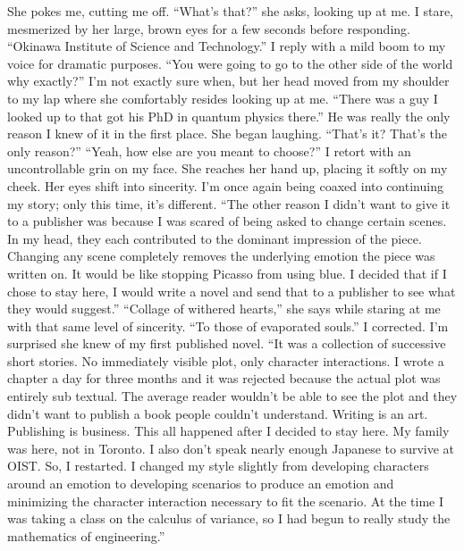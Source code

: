 \documentclass[a4paper, 12pt]{book}
\newcommand\tab[1][1cm]{\hspace*{#1}}
\begin{document}
\newline
\tab
She pokes me, cutting me off. “What’s that?” she asks, looking up at me.
\newline
\tab
I stare, mesmerized by her large, brown eyes for a few seconds before responding. “Okinawa Institute of Science and Technology.” I reply with a mild boom to my voice for dramatic purposes.
“You were going to go to the other side of the world why exactly?” I’m not exactly sure when, but her head moved from my shoulder to my lap where she comfortably resides looking up at me.
\newline
\tab
“There was a guy I looked up to that got his PhD in quantum physics there.” He was really the only reason I knew of it in the first place.
\newline
\tab
She began laughing. “That’s it? That’s the only reason?”
\newline
\tab
“Yeah, how else are you meant to choose?” I retort with an uncontrollable grin on my face. She reaches her hand up, placing it softly on my cheek. Her eyes shift into sincerity. I’m once again being coaxed into continuing my story; only this time, it’s different.  “The other reason I didn’t want to give it to a publisher was because I was scared of being asked to change certain scenes. In my head, they each contributed to the dominant impression of the piece. Changing any scene completely removes the underlying emotion the piece was written on. It would be like stopping Picasso from using blue. I decided that if I chose to stay here, I would write a novel and send that to a publisher to see what they would suggest.”
\newline
\tab
“Collage of withered hearts,” she says while staring at me with that same level of sincerity.
\newline
\tab
“To those of evaporated souls.” I corrected. I’m surprised she knew of my first published novel. “It was a collection of successive short stories. No immediately visible plot, only character interactions. I wrote a chapter a day for three months and it was rejected because the actual plot was entirely sub textual. The average reader wouldn’t be able to see the plot and they didn’t want to publish a book people couldn’t understand. Writing is an art. Publishing is business. This all happened after I decided to stay here. My family was here, not in Toronto. I also don’t speak nearly enough Japanese to survive at OIST. So, I restarted. I changed my style slightly from developing characters around an emotion to developing scenarios to produce an emotion and minimizing the character interaction necessary to fit the scenario. At the time I was taking a class on the calculus of variance, so I had begun to really study the mathematics of engineering.”
\end{document}
